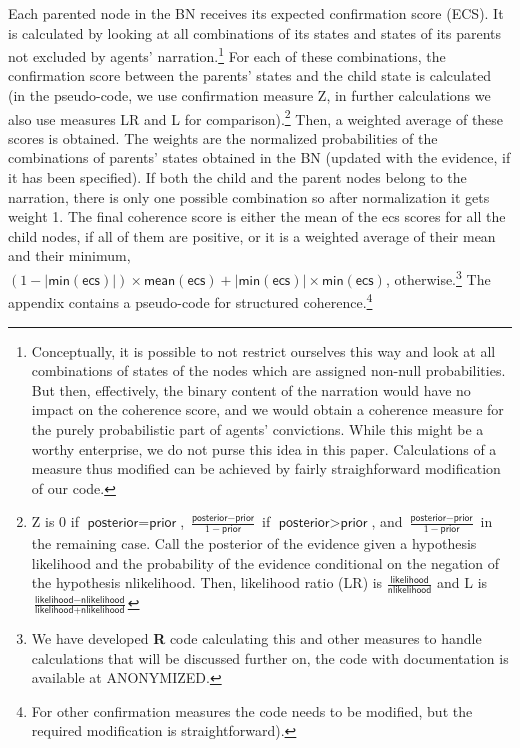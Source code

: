 \documentclass[
  10pt,
]{scrartcl}
\newcommand{\s}[1]{\textsf{#1}}
\begin{document}
Each parented node in the BN receives its expected confirmation score (\s{ECS}). It is calculated by looking at all combinations of its states and states of its parents not excluded by agents' narration.\footnote{Conceptually, it is possible to not restrict ourselves this way and look at all combinations of states of the nodes which are assigned non-null probabilities. But then, effectively, the binary content of the narration would have no impact on the coherence score, and we would obtain a coherence measure for the purely probabilistic part of agents' convictions. While this might be a worthy enterprise, we do not purse this idea in this paper. Calculations of a measure thus modified can be achieved by fairly straighforward modification of our code.} For each of these combinations, the confirmation score between the parents' states and the child state is calculated (in the pseudo-code, we use confirmation measure \s{Z}, in further calculations we also use measures \s{LR} and \s{L} for comparison).\footnote{\s{Z} is \(0\) if \(\s{posterior} = \s{prior}\), \(\frac{\s{posterior} - \s{prior}}{1 - \s{prior}}\) if \({\s{posterior} > \s{prior}}\), and \(\frac{\s{posterior} - \s{prior}}{1 - \s{prior}}\) in the remaining case. Call the posterior of the evidence given a hypothesis \s{likelihood} and the probability of the evidence conditional on the negation of the hypothesis \s{nlikelihood}. Then, likelihood ratio (\s{LR}) is
  \(\frac{\s{likelihood}}{\s{nlikelihood}}\) and \s{L} is \(\frac{\s{likelihood} - \s{nlikelihood}}{\s{likelihood} + \s{nlikelihood}}\)} Then, a weighted average of these scores is obtained. The weights are the normalized probabilities of the combinations of parents' states obtained in the BN (updated with the evidence, if it has been specified). If both the child and the parent nodes belong to the narration, there is only one possible combination so after normalization it gets weight 1. The final coherence score is either the mean of the \s{ecs} scores for all the child nodes, if all of them are positive, or it is a weighted average of their mean and their minimum, \((1- |\s{min}(\s{ecs})|) \times \s{mean}(\s{ecs}) + |\s{min}(\s{ecs})| \times \s{min}(\s{ecs})\), otherwise.\footnote{We have developed \textbf{\textsf{R}} code calculating this and other measures to handle calculations that will be discussed further on, the code with documentation is available at ANONYMIZED.} The appendix contains a pseudo-code for structured coherence.\footnote{For other confirmation measures the code needs to be modified, but the required modification is straightforward).}
\end{document}
